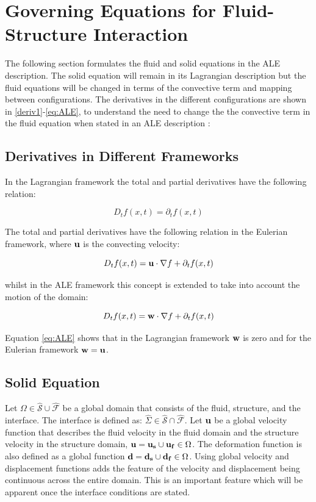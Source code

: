 \section{Governing Equations for Fluid-Structure Interaction}

The following section formulates the fluid and solid equations in the ALE description. The solid equation will remain in its Lagrangian description but the fluid equations will be changed in terms of the convective term and mapping between configurations. The derivatives in the different configurations are shown in \ref{deriv1}-\ref{eq:ALE}, to understand the need to change the the convective term in the fluid equation when stated in an ALE description \cite{Wick2011}:

\subsection{Derivatives in Different Frameworks}

In the Lagrangian framework the total and partial derivatives have the following relation:

\begin{equation}
D_t f(x,t) = \partial_t f(x,t) 
\label{deriv1}
\end{equation}

The total and partial derivatives have the following relation in the Eulerian framework, where $\bold{u}$ is the convecting velocity:

\begin{equation}
D_t f(x,t) = \bold{u}\cdot \nabla{f} + \partial_t f(x,t)
\label{deriv2}
\end{equation}

whilst in the ALE framework this concept is extended to take into account the motion of the domain:

\begin{equation}\label{eq:ALE}
D_t f(x,t) = \bold{w} \cdot\nabla{f} + \partial_t f(x,t)
\end{equation}

Equation \ref{eq:ALE} shows that in the Lagrangian framework $ \bold{w}$ is zero and for the Eulerian framework $\bold{w} = \bold{u}$.

\subsection{Solid Equation}
Let $\Omega \in \hat{\mathcal{S}} \cup \hat{\mathcal{F}} $ be a global domain that consists of the fluid, structure, and the interface. The interface is defined as: $ \hat{\Sigma} \in \hat{\mathcal{S}} \cap \hat{\mathcal{F}}  $. Let $\bold{u}$ be a global velocity function that describes the fluid velocity in the fluid domain and the structure velocity in the structure domain, $\bold{u} = \bold{u_s} \cup \bold{u_f} \in \Omega$. The deformation function is also defined as a global function $\bold{d} = \bold{d_s} \cup \bold{d_f} \in \Omega$. Using global velocity and displacement functions adds the feature of the velocity and displacement being continuous across the entire domain. This is an important feature which will be apparent once the interface conditions are stated. \newline 

